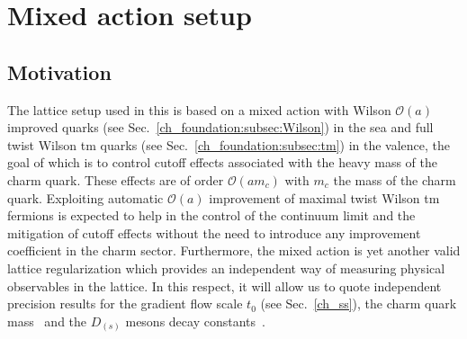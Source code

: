 \chapter{Mixed action setup}%


\label{ch_ma}


\section{Motivation}
\label{ch_ma:sec:introduction}

The lattice setup used in this is based on a mixed action with Wilson $\mathcal{O}(a)$ improved quarks (see Sec.~\ref{ch_foundation:subsec:Wilson}) in the sea and full twist Wilson tm quarks (see Sec.~\ref{ch_foundation:subsec:tm}) in the valence, the goal of which is to control cutoff effects associated with the heavy mass of the charm quark. These effects are of order $\mathcal{O}(am_c)$ with $m_c$ the mass of the charm quark. Exploiting automatic $\mathcal{O}(a)$ improvement of maximal twist Wilson tm fermions is expected to help in the control of the continuum limit and the mitigation of cutoff effects without the need to introduce any improvement coefficient in the charm sector. Furthermore, the mixed action is yet another valid lattice regularization which provides an independent way of measuring physical observables in the lattice. In this respect, it will allow us to quote independent precision results for the gradient flow scale $t_0$ (see Sec.~\ref{ch_ss}), the charm quark mass~\citep{charm} and the $D_{(s)}$ mesons decay constants~\citep{charm}.


